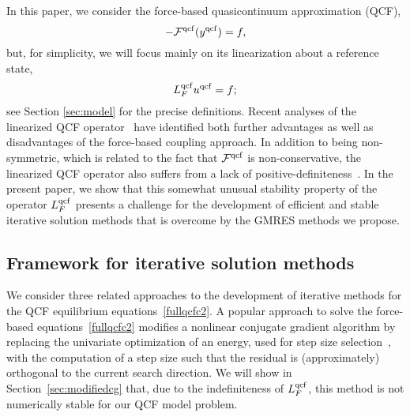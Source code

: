 \documentclass[12pt,reqno]{amsart}
\begin{document}
In this paper, we consider the force-based quasicontinuum
approximation (QCF),
\begin{equation}
  \label{fullqcfc2}
  -{{\mathcal{F}}^{{\rm qcf}}}({y^{{\rm qcf}}})=f,
\end{equation}
but, for simplicity, we will focus mainly on its linearization about a
reference state,
\begin{displaymath}
  
  {L^{{\rm qcf}}_F} {u^{{\rm qcf}}} = f;
\end{displaymath}
see Section \ref{sec:model} for the precise definitions.  Recent
analyses of the linearized QCF
operator~\cite{dobs-qcf2,sharpstabilityqcf} have identified both
further advantages as well as disadvantages of the force-based
coupling approach.  In addition to being non-symmetric, which is
related to the fact that ${{\mathcal{F}}^{{\rm qcf}}}$ is non-conservative, the linearized
QCF operator also suffers from a lack of
positive-definiteness~\cite{dobs-qcf2}.  In the present paper, we show
that this somewhat unusual stability property of the operator ${L^{{\rm qcf}}_F}$
presents a challenge for the development of efficient and stable
iterative solution methods that is overcome by the GMRES methods we
propose.

\subsection{Framework for iterative solution methods}
We consider three related approaches to the development of iterative
methods for the QCF equilibrium
equations~\eqref{fullqcfc2}.
A popular approach \cite{Miller:2008} to solve the force-based
equations~\eqref{fullqcfc2}
modifies a nonlinear conjugate gradient algorithm by replacing the
univariate optimization of an energy, used for step size
selection~\cite{NocedalWright99}, with the computation of a step size
such that the residual is (approximately) orthogonal to the current
search direction.  We will show in Section~\ref{sec:modifiedcg} that,
due to the indefiniteness of ${L^{{\rm qcf}}_F}$, this method is not numerically
stable for our QCF model problem.
\end{document}
